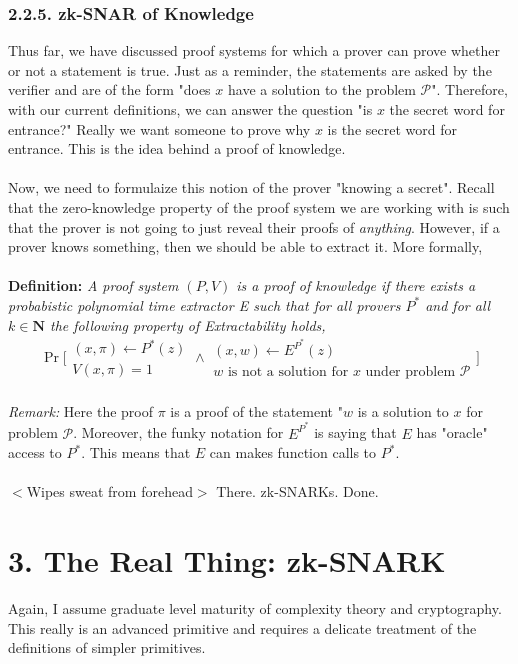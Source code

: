 \documentclass{article}
\newcommand{\N}{{\mathbf N}}
\begin{document}
\subsubsection*{2.2.5. zk-SNAR of Knowledge}
Thus far, we have discussed proof systems for which a prover can prove whether or not a statement is true. Just as a reminder, the statements are asked by the verifier and are of the form "does $x$ have a solution to the problem $\mathcal{P}$". Therefore, with our current definitions, we can answer the question "is $x$ the secret word for entrance?" Really we want someone to prove why $x$ is the secret word for entrance. This is the idea behind a proof of knowledge. \\ \\
\noindent Now, we need to formulaize this notion of the prover "knowing a secret". Recall that the zero-knowledge property of the proof system we are working with is such that the prover is not going to just reveal their proofs of \textit{anything}. However, if a prover knows something, then we should be able to extract it. More formally, \\ \\
\noindent \textbf{Definition: } \textit{A proof system $(P, V)$ is a proof of knowledge if there exists a probabistic polynomial time extractor E such that for all provers $P^*$ and for all $k \in \N$ the following property of Extractability holds,}
$$\Pr\bigg[\begin{array}{c} (x, \pi) \leftarrow P^*(z) \\ V(x, \pi) = 1\end{array} \wedge \begin{array}{c} (x, w) \leftarrow E^{P^*}(z) \\ w \text{ is not a solution for } x \text{ under problem } \mathcal{P}\end{array}\bigg]$$
\\
\noindent \textit{Remark: } Here the proof $\pi$ is a proof of the statement "$w$ is a solution to $x$ for problem $\mathcal{P}$. Moreover, the funky notation for $E^{P^*}$ is saying that $E$ has "oracle" access to $P^*$. This means that $E$ can makes function calls to $P^*$.\\ \\
\noindent $<$Wipes sweat from forehead$>$ There. zk-SNARKs. Done.

\section*{3. The Real Thing: zk-SNARK}
Again, I assume graduate level maturity of complexity theory and cryptography. This really is an advanced primitive and requires a delicate treatment of the definitions of simpler primitives.
\end{document}
